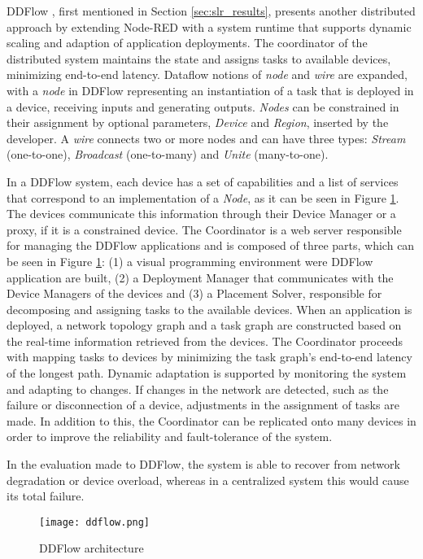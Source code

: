 \par DDFlow \cite{ddflow}, first mentioned in Section \ref{sec:slr_results}, presents another distributed approach by extending Node-RED with a system runtime that supports dynamic scaling and adaption of application deployments. The coordinator of the distributed system maintains the state and assigns tasks to available devices, minimizing end-to-end latency. Dataflow notions of \textit{node} and \textit{wire} are expanded, with a \textit{node} in DDFlow representing an instantiation of a task that is deployed in a device, receiving inputs and generating outputs. \textit{Nodes} can be constrained in their assignment by optional parameters, \textit{Device} and \textit{Region}, inserted by the developer. A \textit{wire} connects two or more nodes and can have three types: \textit{Stream} (one-to-one), \textit{Broadcast} (one-to-many) and \textit{Unite} (many-to-one). 
\par In a DDFlow system, each device has a set of capabilities and a list of services that correspond to an implementation of a \textit{Node}, as it can be seen in Figure \ref{fig:ddflow}. The devices communicate this information through their Device Manager or a proxy, if it is a constrained device. The Coordinator is a web server responsible for managing the DDFlow applications and is composed of three parts, which can be seen in Figure \ref{fig:ddflow}: (1) a visual programming environment were DDFlow application are built, (2) a Deployment Manager that communicates with the Device Managers of the devices and (3) a Placement Solver, responsible for decomposing and assigning tasks to the available devices. When an application is deployed, a network topology graph and a task graph are constructed based on the real-time information retrieved from the devices. The Coordinator proceeds with mapping tasks to devices by minimizing the task graph's end-to-end latency of the longest path. Dynamic adaptation is supported by monitoring the system and adapting to changes. If changes in the network are detected, such as the failure or disconnection of a device, adjustments in the assignment of tasks are made. In addition to this, the Coordinator can be replicated onto many devices in order to improve the reliability and fault-tolerance of the system.
\par In the evaluation made to DDFlow, the system is able to recover from network degradation or device overload, whereas in a centralized system this would cause its total failure.

\begin{figure}[h]
\caption{DDFlow architecture}
\label{fig:ddflow}
\centering
\texttt{[image: ddflow.png]}
\end{figure}

